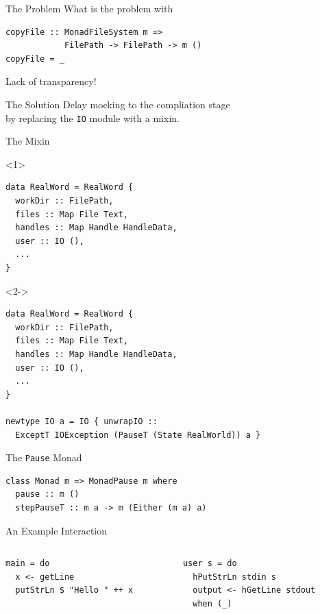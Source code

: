 \documentclass{beamer}
\begin{document}
\begin{frame}[fragile]{The Problem}
What is the problem with
\begin{verbatim}
copyFile :: MonadFileSystem m =>
            FilePath -> FilePath -> m ()
copyFile = _ 
\end{verbatim}
\pause
\vfill
\begin{center}
  \alert{\Large Lack of transparency!}
\end{center}
\end{frame}

\begin{frame}{The Solution}
  \large
  Delay mocking to the compliation stage\\[1.5em]
  \pause
  \qquad by replacing the \texttt{IO} module with a mixin.
\end{frame}

\begin{frame}[fragile]{The Mixin}
\begin{onlyenv}<1>
\begin{verbatim}
data RealWord = RealWord {
  workDir :: FilePath,
  files :: Map File Text,
  handles :: Map Handle HandleData,
  user :: IO (),
  ...
}
\end{verbatim}
\end{onlyenv}
\begin{visibleenv}<2->
\begin{verbatim}
data RealWord = RealWord {
  workDir :: FilePath,
  files :: Map File Text,
  handles :: Map Handle HandleData,
  user :: IO (),
  ...
}

newtype IO a = IO { unwrapIO :: 
  ExceptT IOException (PauseT (State RealWorld)) a }
\end{verbatim}
\end{visibleenv}
\end{frame}

\begin{frame}[fragile]{The \texttt{Pause} Monad}
\begin{verbatim}
class Monad m => MonadPause m where
  pause :: m ()
  stepPauseT :: m a -> m (Either (m a) a)
\end{verbatim}
\end{frame}

\begin{frame}[fragile]{An Example Interaction}
  \begin{columns}
    \begin{column}{0.5\textwidth}
\begin{verbatim}
main = do
  x <- getLine
  putStrLn $ "Hello " ++ x
\end{verbatim}
    \end{column}
    \begin{column}{0.5\textwidth}
\begin{verbatim}
user s = do
  hPutStrLn stdin s
  output <- hGetLine stdout
  when (_)
\end{verbatim}
    \end{column}
  \end{columns}
\end{frame}
\end{document}
